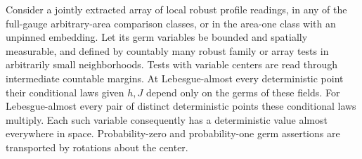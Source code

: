 \begin{lemma}\label{conf:germ-determinism}
Consider a jointly extracted array of local robust profile readings, in any of the full-gauge
arbitrary-area comparison classes, or in the area-one class with an unpinned embedding. Let its germ
variables be bounded and spatially measurable, and defined by countably many robust family or array
tests in arbitrarily small neighborhoods. Tests with variable centers are read through intermediate
countable margins. At Lebesgue-almost every deterministic point their conditional laws given \(h,J\)
depend only on the germs of these fields. For Lebesgue-almost every pair of distinct deterministic
points these conditional laws multiply. Each such variable consequently has a deterministic value
almost everywhere in space. Probability-zero and probability-one germ assertions are transported by
rotations about the center.
\end{lemma}
